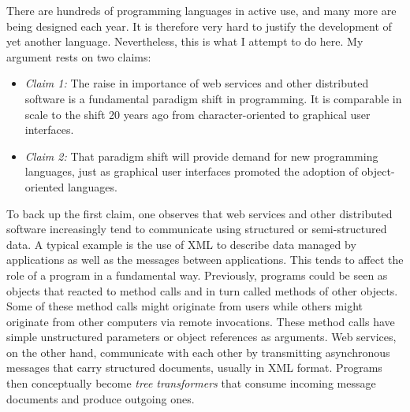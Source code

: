 
There are hundreds of programming languages in active use, and many more are
being designed each year. It is therefore very hard to justify the development
of yet another language. Nevertheless, this is what I attempt to do here. My
argument rests on two claims:
\begin{itemize}
\item[] {\em Claim 1:} The raise in importance of web services and
other distributed software is a fundamental paradigm
shift in programming. It is comparable in scale to the shift 20 years ago
from character-oriented to graphical user interfaces.
\item[] {\em Claim 2:} That paradigm shift will provide demand
for new programming languages, just as graphical user interfaces
promoted the adoption of object-oriented languages.
\end{itemize}
To back up the first claim, one observes that web services and other
distributed software increasingly tend to communicate using structured or
semi-structured data. A typical example is the use of XML to describe data
managed by applications as well as the messages between applications. This
tends to affect the role of a program in a fundamental way. Previously,
programs could be seen as objects that reacted to method calls and in turn
called methods of other objects. Some of these method calls might originate
from users while others might originate from other computers via remote
invocations.  These method calls have simple unstructured parameters or object
references as arguments.  Web services, on the other hand, communicate with
each other by transmitting asynchronous messages that carry structured
documents, usually in XML format. Programs then conceptually become {\em tree
transformers} that consume incoming message documents and produce outgoing
ones.

